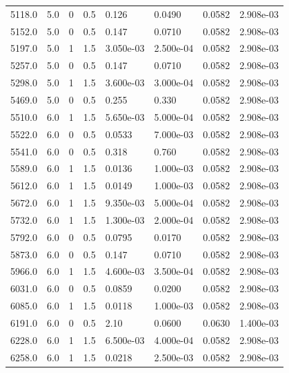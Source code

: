 \documentclass[preview]{standalone}
\begin{document}
{{{\begin{tabular}{L{1.2cm}C{1.2cm} C{0.3cm}C{0.5cm} C{1.4cm}C{1.4cm} C{1.4cm}C{1.4cm}}
  5118.0  &   5.0  & 0     & 0.5 &  0.126  & 0.0490  & 0.0582 &  2.908e-03   \\ 
  5152.0  &   5.0  & 0     & 0.5 &  0.147  & 0.0710  & 0.0582 &  2.908e-03   \\ 
  5197.0  &   5.0  & 1     & 1.5 &  3.050e-03  & 2.500e-04  & 0.0582 &  2.908e-03   \\ 
  5257.0  &   5.0  & 0     & 0.5 &  0.147  & 0.0710  & 0.0582 &  2.908e-03   \\ 
  5298.0  &   5.0  & 1     & 1.5 &  3.600e-03  & 3.000e-04  & 0.0582 &  2.908e-03   \\ 
  5469.0  &   5.0  & 0     & 0.5 &  0.255  & 0.330  & 0.0582 &  2.908e-03   \\ 
  5510.0  &   6.0  & 1     & 1.5 &  5.650e-03  & 5.000e-04  & 0.0582 &  2.908e-03   \\ 
  5522.0  &   6.0  & 0     & 0.5 &  0.0533  & 7.000e-03  & 0.0582 &  2.908e-03   \\ 
  5541.0  &   6.0  & 0     & 0.5 &  0.318  & 0.760  & 0.0582 &  2.908e-03   \\ 
  5589.0  &   6.0  & 1     & 1.5 &  0.0136  & 1.000e-03  & 0.0582 &  2.908e-03   \\ 
  5612.0  &   6.0  & 1     & 1.5 &  0.0149  & 1.000e-03  & 0.0582 &  2.908e-03   \\ 
  5672.0  &   6.0  & 1     & 1.5 &  9.350e-03  & 5.000e-04  & 0.0582 &  2.908e-03   \\ 
  5732.0  &   6.0  & 1     & 1.5 &  1.300e-03  & 2.000e-04  & 0.0582 &  2.908e-03   \\ 
  5792.0  &   6.0  & 0     & 0.5 &  0.0795  & 0.0170  & 0.0582 &  2.908e-03   \\ 
  5873.0  &   6.0  & 0     & 0.5 &  0.147  & 0.0710  & 0.0582 &  2.908e-03   \\ 
  5966.0  &   6.0  & 1     & 1.5 &  4.600e-03  & 3.500e-04  & 0.0582 &  2.908e-03   \\ 
  6031.0  &   6.0  & 0     & 0.5 &  0.0859  & 0.0200  & 0.0582 &  2.908e-03   \\ 
  6085.0  &   6.0  & 1     & 1.5 &  0.0118  & 1.000e-03  & 0.0582 &  2.908e-03   \\ 
  6191.0  &   6.0  & 0     & 0.5 &  2.10  & 0.0600  & 0.0630 &  1.400e-03   \\ 
  6228.0  &   6.0  & 1     & 1.5 &  6.500e-03  & 4.000e-04  & 0.0582 &  2.908e-03   \\ 
  6258.0  &   6.0  & 1     & 1.5 &  0.0218  & 2.500e-03  & 0.0582 &  2.908e-03   \\ 

\end{tabular}}}}
\end{document}
